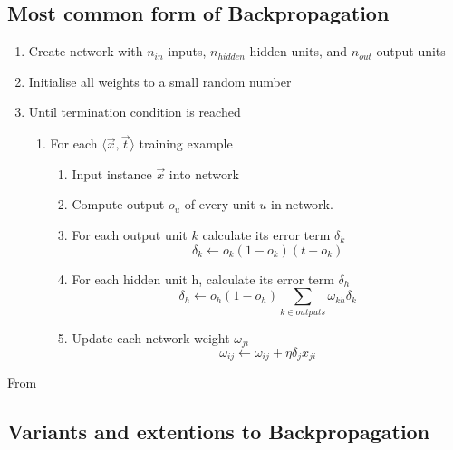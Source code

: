 \documentclass[10pt,a4paper]{article}
\begin{document}
\subsection{Most common form of Backpropagation}
\begin{enumerate}
\item Create network with $n_{in}$ inputs, $n_{hidden}$ hidden units, and $n_{out}$ output units
\item Initialise all weights to a small random number 
\item Until termination condition is reached
    \begin{enumerate}
    \item For each $\langle\vec{x},\vec{t}\rangle$ training example
         \begin{enumerate}
         \item Input instance $\vec{x}$ into network
         \item Compute output $o_u$ of every unit $u$ in network.
         \item For each output unit $k$ calculate its error term $\delta_k$
             \begin{equation}
             \delta_k \leftarrow o_k(1-o_k)(t-o_k)
             \end{equation}
         \item For each hidden unit h, calculate its error term $\delta_h$
             \begin{equation}
             \delta_h \leftarrow o_h(1-o_h)\sum_{k\in outputs} \omega_{kh}\delta_k
             \end{equation}
         \item Update each network weight $\omega_{ji}$
             \begin{equation}
             \label{backpropupdate}
             \omega_{ij} \leftarrow \omega_{ij} + \eta \delta_j x_{ji}
             \end{equation}                                          
         \end{enumerate}                 
    \end{enumerate}
\end{enumerate}

From \cite[p98]{Michell2009}

\subsection{Variants and extentions to Backpropagation}
\end{document}
